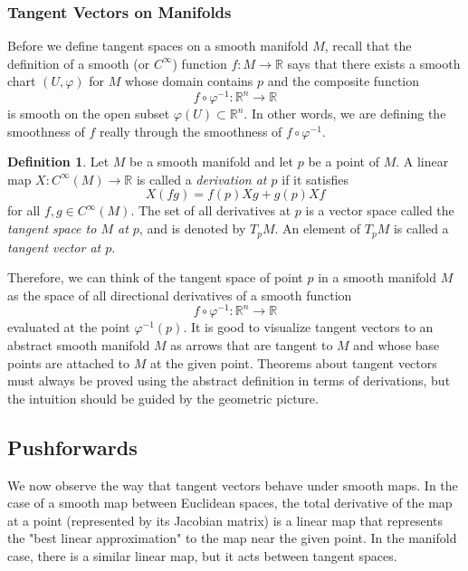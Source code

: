 \documentclass{article}
\theoremstyle{remark}
\theoremstyle{definition}
\newtheorem{definition}{Definition}[section]
\begin{document}
\subsubsection{Tangent Vectors on Manifolds}

Before we define tangent spaces on a smooth manifold $M$, recall that the definition of a smooth (or $C^\infty$) function $f: M \longrightarrow \mathbb{R}$ says that there exists a smooth chart $(U, \varphi)$ for $M$ whose domain contains $p$ and the composite function
\[f \circ \varphi^{-1}: \mathbb{R}^n \longrightarrow \mathbb{R}\]
is smooth on the open subset $\varphi(U) \subset \mathbb{R}^n$. In other words, we are defining the smoothness of $f$ really through the smoothness of $f \circ \varphi^{-1}$. 

\begin{definition}
Let $M$ be a smooth manifold and let $p$ be a point of $M$. A linear map $X: C^\infty (M) \longrightarrow \mathbb{R}$ is called a \textit{derivation at $p$} if it satisfies 
\[X(f g) = f(p) X g + g(p) X f\]
for all $f, g \in C^\infty (M)$. The set of all derivatives at $p$ is a vector space called the \textit{tangent space to $M$ at $p$}, and is denoted by $T_p M$. An element of $T_p M$ is called a \textit{tangent vector at $p$}. 
\end{definition}

Therefore, we can think of the tangent space of point $p$ in a smooth manifold $M$ as the space of all directional derivatives of a smooth function 
\[f \circ \varphi^{-1}: \mathbb{R}^n \longrightarrow \mathbb{R}\]
evaluated at the point $\varphi^{-1} (p)$. It is good to visualize tangent vectors to an abstract smooth manifold $M$ as arrows that are tangent to $M$ and whose base points are attached to $M$ at the given point. Theorems about tangent vectors must always be proved using the abstract definition in terms of derivations, but the intuition should be guided by the geometric picture. 

\subsection{Pushforwards}
We now observe the way that tangent vectors behave under smooth maps. In the case of a smooth map between Euclidean spaces, the total derivative of the map at a point (represented by its Jacobian matrix) is a linear map that represents the "best linear approximation" to the map near the given point. In the manifold case, there is a similar linear map, but it acts between tangent spaces. 
\end{document}
